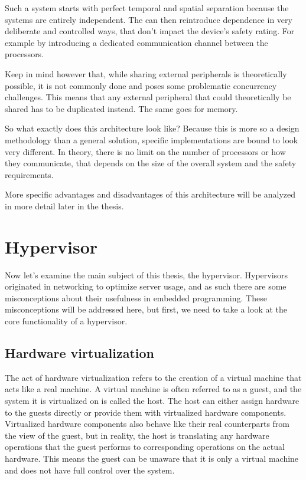 Such a system starts with perfect temporal and spatial separation because the systems are entirely independent. The \mfg{} can then reintroduce dependence in very deliberate and controlled ways, that don't impact the device's safety rating. For example by introducing a dedicated communication channel between the processors. 

Keep in mind however that, while sharing external peripherals is theoretically possible, it is not commonly done and poses some problematic concurrency challenges. This means that any external peripheral that could theoretically be shared has to be duplicated instead. The same goes for memory.

So what exactly does this architecture look like? Because this is more so a design methodology than a general solution, specific implementations are bound to look very different. In theory, there is no limit on the number of processors or how they communicate, that depends on the size of the overall system and the safety requirements. 

More specific advantages and disadvantages of this architecture will be analyzed in more detail later in the thesis.

\section{Hypervisor}
Now let’s examine the main subject of this thesis, the hypervisor. Hypervisors originated in networking to optimize server usage, and as such there are some misconceptions about their usefulness in embedded programming. These misconceptions will be addressed here, but first, we need to take a look at the core functionality of a hypervisor.

\subsection{Hardware virtualization} \label{hw-virt}
The act of hardware virtualization refers to the creation of a virtual machine that acts like a real machine. A virtual machine is often referred to as a guest, and the system it is virtualized on is called the host. The host can either assign hardware to the guests directly or provide them with virtualized hardware components. Virtualized hardware components also behave like their real counterparts from the view of the guest, but in reality, the host is translating any hardware operations that the guest performs to corresponding operations on the actual hardware. This means the guest can be unaware that it is only a virtual machine and does not have full control over the system.

